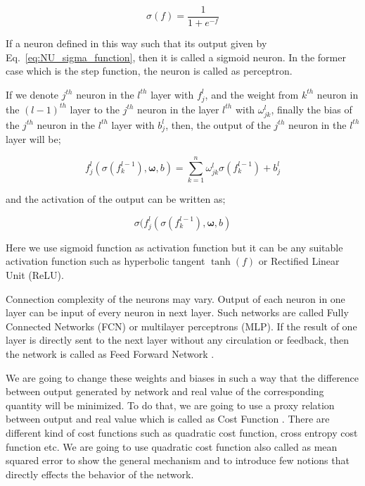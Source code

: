 \documentclass[a4paper,times,12pt]{article}
\begin{document}
\begin{equation}
\label{eq:NU_sigma_function}
\sigma(f) = \frac{1}{1 + e^{-f}}
\end{equation}

If a neuron defined in this way such that its output given by Eq.~\eqref{eq:NU_sigma_function}, then it is called a sigmoid neuron. In the former case which is the step function, the neuron is called as perceptron. 

If we denote $j^{th}$ neuron in the $l^{th}$ layer with $f_j^l$, and the weight from $k^{th}$ neuron in the $(l-1)^{th}$ layer to the $j^{th}$ neuron in the layer $l^{th}$ with $\omega_{jk}^l$, finally the bias of the $j^{th}$ neuron in the $l^{th}$ layer with ${b_j^l}$, then, the output of the $j^{th}$ neuron in the $l^{th}$ layer will be;

\begin{equation}
\label{eq:NU_neuron_connection}
f_j^{l}(\sigma(f_k^{l-1}), \boldsymbol{\omega}, b) = \sum\limits_{k=1}^{n} \omega_{jk}^{l}\sigma(f_k^{l-1}) + b_j^l
\end{equation}

\noindent and the activation of the output can be written as;

\begin{equation}
\sigma(f_j^{l}(\sigma(f_k^{l-1}), \boldsymbol{\omega}, b)
\end{equation}


\noindent Here we use sigmoid function as activation function but it can be any suitable activation function such as hyperbolic tangent $\tanh(f)$ or Rectified Linear Unit (ReLU).

Connection complexity of the neurons may vary. Output of each neuron in one layer can be input of every neuron in next layer. Such networks are called Fully Connected Networks (FCN) or multilayer perceptrons (MLP)\cite{nielsen2015neural}. If the result of one layer is directly sent to the next layer without any circulation or feedback, then the network is called as Feed Forward Network \cite{nielsen2015neural}.

We are going to change these weights and biases in such a way that the difference between output generated by network and real value of the corresponding quantity will be minimized. To do that, we are going to use a proxy relation between output and real value which is called as Cost Function \cite{nielsen2015neural}. There are different kind of cost functions such as quadratic cost function, cross entropy cost function etc. We are going to use quadratic cost function also called as mean squared error to show the general mechanism and to introduce few notions that directly effects the behavior of the network. 
\end{document}
